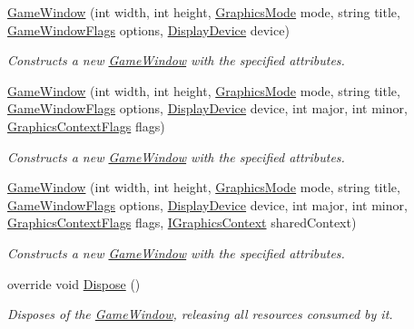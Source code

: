 \begin{DoxyCompactItemize}
\hyperlink{class_open_t_k_1_1_game_window_a90aa895bd34e5d602dd84aacc1a25b16}{Game\-Window} (int width, int height, \hyperlink{class_open_t_k_1_1_graphics_1_1_graphics_mode}{Graphics\-Mode} mode, string title, \hyperlink{namespace_open_t_k_af73dc15fc9d5b87827c81fa11b3ec6f0}{Game\-Window\-Flags} options, \hyperlink{class_open_t_k_1_1_display_device}{Display\-Device} device)
\begin{DoxyCompactList}\small\item\em Constructs a new \hyperlink{class_open_t_k_1_1_game_window}{Game\-Window} with the specified attributes.\end{DoxyCompactList}\item 
\hyperlink{class_open_t_k_1_1_game_window_a58bde9e41f887e4c1e8b46b409bdcb8e}{Game\-Window} (int width, int height, \hyperlink{class_open_t_k_1_1_graphics_1_1_graphics_mode}{Graphics\-Mode} mode, string title, \hyperlink{namespace_open_t_k_af73dc15fc9d5b87827c81fa11b3ec6f0}{Game\-Window\-Flags} options, \hyperlink{class_open_t_k_1_1_display_device}{Display\-Device} device, int major, int minor, \hyperlink{namespace_open_t_k_1_1_graphics_a518f77952bc406a013160356981ea8ab}{Graphics\-Context\-Flags} flags)
\begin{DoxyCompactList}\small\item\em Constructs a new \hyperlink{class_open_t_k_1_1_game_window}{Game\-Window} with the specified attributes.\end{DoxyCompactList}\item 
\hyperlink{class_open_t_k_1_1_game_window_a3d7f0ea4fc9284bc967f0a42d5b084e4}{Game\-Window} (int width, int height, \hyperlink{class_open_t_k_1_1_graphics_1_1_graphics_mode}{Graphics\-Mode} mode, string title, \hyperlink{namespace_open_t_k_af73dc15fc9d5b87827c81fa11b3ec6f0}{Game\-Window\-Flags} options, \hyperlink{class_open_t_k_1_1_display_device}{Display\-Device} device, int major, int minor, \hyperlink{namespace_open_t_k_1_1_graphics_a518f77952bc406a013160356981ea8ab}{Graphics\-Context\-Flags} flags, \hyperlink{interface_open_t_k_1_1_graphics_1_1_i_graphics_context}{I\-Graphics\-Context} shared\-Context)
\begin{DoxyCompactList}\small\item\em Constructs a new \hyperlink{class_open_t_k_1_1_game_window}{Game\-Window} with the specified attributes.\end{DoxyCompactList}\item 
override void \hyperlink{class_open_t_k_1_1_game_window_acfd19fafb5563df42e2104ea38c2889a}{Dispose} ()
\begin{DoxyCompactList}\small\item\em Disposes of the \hyperlink{class_open_t_k_1_1_game_window}{Game\-Window}, releasing all resources consumed by it. \end{DoxyCompactList}\item 

\end{DoxyCompactItemize}
